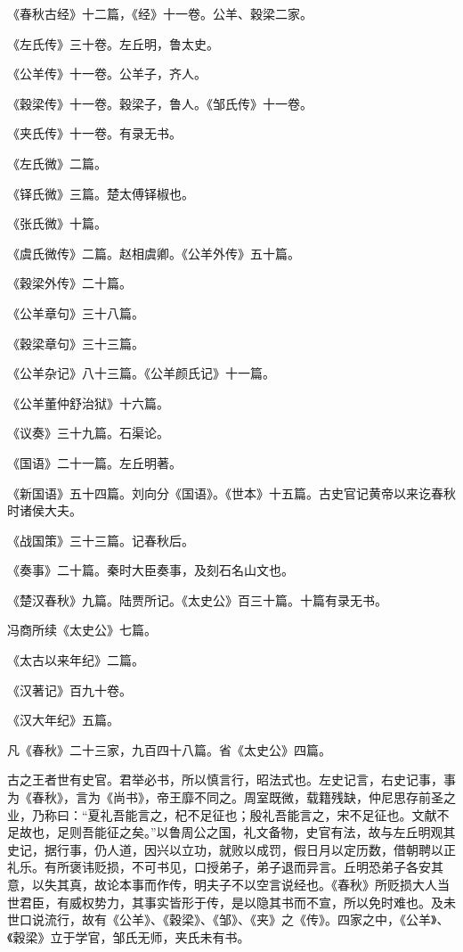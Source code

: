 \documentclass[]{article}
\begin{document}
《春秋古经》十二篇，《经》十一卷。公羊、穀梁二家。

《左氏传》三十卷。左丘明，鲁太史。

《公羊传》十一卷。公羊子，齐人。

《穀梁传》十一卷。穀梁子，鲁人。《邹氏传》十一卷。

《夹氏传》十一卷。有录无书。

《左氏微》二篇。

《铎氏微》三篇。楚太傅铎椒也。

《张氏微》十篇。

《虞氏微传》二篇。赵相虞卿。《公羊外传》五十篇。

《穀梁外传》二十篇。

《公羊章句》三十八篇。

《穀梁章句》三十三篇。

《公羊杂记》八十三篇。《公羊颜氏记》十一篇。

《公羊董仲舒治狱》十六篇。

《议奏》三十九篇。石渠论。

《国语》二十一篇。左丘明著。

《新国语》五十四篇。刘向分《国语》。《世本》十五篇。古史官记黄帝以来讫春秋时诸侯大夫。

《战国策》三十三篇。记春秋后。

《奏事》二十篇。秦时大臣奏事，及刻石名山文也。

《楚汉春秋》九篇。陆贾所记。《太史公》百三十篇。十篇有录无书。

冯商所续《太史公》七篇。

《太古以来年纪》二篇。

《汉著记》百九十卷。

《汉大年纪》五篇。

凡《春秋》二十三家，九百四十八篇。省《太史公》四篇。

古之王者世有史官。君举必书，所以慎言行，昭法式也。左史记言，右史记事，事为《春秋》，言为《尚书》，帝王靡不同之。周室既微，载籍残缺，仲尼思存前圣之业，乃称曰：``夏礼吾能言之，杞不足征也；殷礼吾能言之，宋不足征也。文献不足故也，足则吾能征之矣。''以鲁周公之国，礼文备物，史官有法，故与左丘明观其史记，据行事，仍人道，因兴以立功，就败以成罚，假日月以定历数，借朝聘以正礼乐。有所褒讳贬损，不可书见，口授弟子，弟子退而异言。丘明恐弟子各安其意，以失其真，故论本事而作传，明夫子不以空言说经也。《春秋》所贬损大人当世君臣，有威权势力，其事实皆形于传，是以隐其书而不宣，所以免时难也。及未世口说流行，故有《公羊》、《穀梁》、《邹》、《夹》之《传》。四家之中，《公羊》、《穀梁》立于学官，邹氏无师，夹氏未有书。
\end{document}
